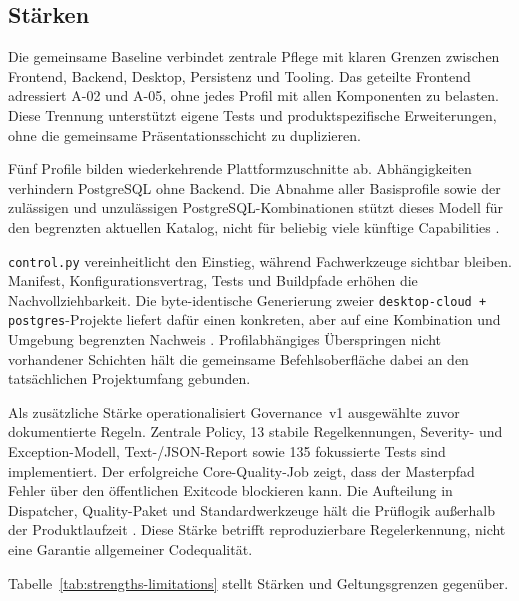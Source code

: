 \subsection{Stärken}
\label{subsec:staerken}

Die gemeinsame Baseline verbindet zentrale Pflege mit klaren Grenzen zwischen
Frontend, Backend, Desktop, Persistenz und Tooling. Das geteilte Frontend
adressiert A-02 und A-05, ohne jedes Profil mit allen Komponenten zu belasten.
Diese Trennung unterstützt eigene Tests und produktspezifische Erweiterungen,
ohne die gemeinsame Präsentationsschicht zu duplizieren.

Fünf Profile bilden wiederkehrende Plattformzuschnitte ab. Abhängigkeiten
verhindern PostgreSQL ohne Backend. Die Abnahme aller Basisprofile sowie der
zulässigen und unzulässigen PostgreSQL-Kombinationen stützt dieses Modell für
den begrenzten aktuellen Katalog, nicht für beliebig viele künftige
Capabilities \parencite{kleiveist2026acceptance}.

\texttt{control.py} vereinheitlicht den Einstieg, während Fachwerkzeuge
sichtbar bleiben. Manifest, Konfigurationsvertrag, Tests und Buildpfade erhöhen
die Nachvollziehbarkeit. Die byte-identische Generierung zweier
\texttt{desktop-cloud + postgres}-Projekte liefert dafür einen konkreten, aber
auf eine Kombination und Umgebung begrenzten Nachweis
\parencite{kleiveist2026acceptance}.
Profilabhängiges Überspringen nicht vorhandener Schichten hält die gemeinsame
Befehlsoberfläche dabei an den tatsächlichen Projektumfang gebunden.

Als zusätzliche Stärke operationalisiert Governance~v1 ausgewählte zuvor
dokumentierte Regeln. Zentrale Policy, 13 stabile Regelkennungen,
Severity- und Exception-Modell, Text-/JSON-Report sowie 135 fokussierte Tests
sind implementiert. Der erfolgreiche Core-Quality-Job zeigt, dass der
Masterpfad Fehler über den öffentlichen Exitcode blockieren kann. Die
Aufteilung in Dispatcher, Quality-Paket und Standardwerkzeuge hält die
Prüflogik außerhalb der Produktlaufzeit
\parencite{kleiveist2026quality-implementation,kleiveist2026governance-core-run}.
Diese Stärke betrifft reproduzierbare Regelerkennung, nicht eine Garantie
allgemeiner Codequalität.

Tabelle~\ref{tab:strengths-limitations} stellt Stärken und Geltungsgrenzen
gegenüber.


